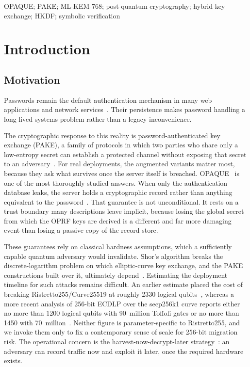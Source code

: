 \documentclass{ieeeijc}
\newcommand{\codeid}[1]{\textsf{#1}}
\theoremstyle{remark}
\begin{document}
\begin{keywords}
OPAQUE; PAKE; ML-KEM-768; post-quantum cryptography; hybrid key exchange; HKDF; symbolic verification
\end{keywords}

\titlepgskip=-15pt
\maketitle

\section{Introduction}

\subsection{Motivation}

Passwords remain the default authentication mechanism in many web applications
and network services~\cite{bonneau2012,florencio2007}. Their persistence makes
password handling a long-lived systems problem rather than a legacy inconvenience.

The cryptographic response to this reality is password-authenticated key
exchange (PAKE), a family of protocols in which two parties who share only a
low-entropy secret can establish a protected channel without exposing that
secret to an adversary~\cite{bellare2000}. For real deployments, the augmented
variants matter most, because they ask what survives once the server itself is
breached. OPAQUE~\cite{jarecki2018} is one of the most thoroughly studied
answers. When only the authentication database leaks, the server holds a
cryptographic record rather than anything equivalent to the password~\cite{ietf-opaque}.
That guarantee is not unconditional. It rests on a trust boundary many
descriptions leave implicit, because losing the global secret from which the
OPRF keys are derived is a different and far more damaging event than losing a
passive copy of the record store.

These guarantees rely on classical hardness assumptions, which a sufficiently
capable quantum adversary would invalidate. Shor's algorithm breaks the
discrete-logarithm problem on which elliptic-curve key exchange, and the PAKE
constructions built over it, ultimately depend~\cite{shor1994,bernstein2017}.
Estimating the deployment timeline for such attacks remains difficult. An
earlier estimate placed the cost of breaking Ristretto255/Curve25519 at roughly
2330 logical qubits~\cite{roetteler2017}, whereas a more recent analysis of
256-bit ECDLP over the \codeid{secp256k1} curve reports either no more than
1200 logical qubits with 90~million Toffoli gates or no more than 1450 with
70~million~\cite{babbush2026}. Neither figure is parameter-specific to
Ristretto255, and we invoke them only to fix a contemporary sense of scale for
256-bit migration risk. The operational concern is the
harvest-now-decrypt-later strategy~\cite{mosca2018}: an adversary can record
traffic now and exploit it later, once the required hardware exists.
\end{document}
